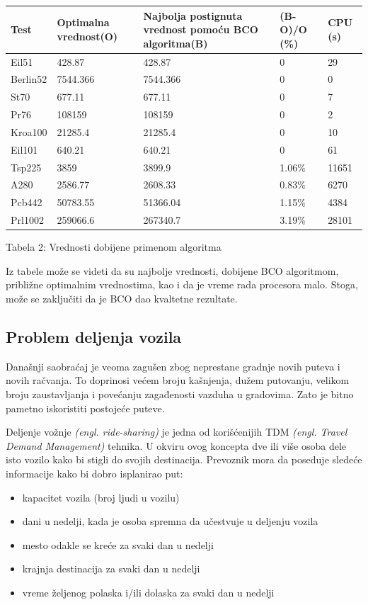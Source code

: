 \documentclass[a4paper]{article}
\begin{document}
{\begin{center}
\begin{tabular}{|p{1.2cm}|p{2cm}|p{2cm}|p{1.4cm}|p{1cm}|}
 \hline
Test & Optimalna vrednost(O) & Najbolja postignuta vrednost pomoću BCO algoritma(B)& (B-O)/O (\%) &CPU (s) \\ \hline
Eil51&428.87&428.87&0&29\\ \hline
Berlin52&7544.366&7544.366&0&0\\ \hline
St70&677.11&677.11&0&7\\ \hline
Pr76&108159&108159&0&2\\ \hline
Kroa100&21285.4&21285.4&0&10\\ \hline
Eil101&640.21&640.21&0&61\\ \hline
Tsp225&3859&3899.9&1.06\%&11651\\ \hline
A280&2586.77&2608.33&0.83\%&6270\\ \hline
Pcb442&50783.55&51366.04&1.15\%&4384\\ \hline
Prl1002&259066.6&267340.7&3.19\%&28101\\ \hline
\end{tabular}\par
\bigskip
Tabela 2: Vrednosti dobijene primenom algoritma
\end{center}
Iz tabele može se videti da su najbolje vrednosti, dobijene BCO algoritmom, približne optimalnim vrednostima, kao i da je vreme rada procesora malo. Stoga, može se zaključiti da je BCO dao kvaltetne rezultate.

\subsection{Problem deljenja vozila}
\label{subsec:drugaprimena}
Današnji saobraćaj je veoma zagušen zbog neprestane gradnje novih puteva i novih račvanja. To doprinosi većem broju kašnjenja, dužem putovanju, velikom broju zaustavljanja i povećanju zagađenosti vazduha u gradovima. Zato je bitno pametno iskoristiti postojeće puteve. 

Deljenje vožnje {\em(engl. ride-sharing)} je jedna od korišćenijih TDM {\em (engl. Travel Demand Management)} tehnika. U okviru ovog koncepta dve ili više osoba dele isto vozilo kako bi stigli do svojih destinacija. Prevoznik mora da poseduje sledeće informacije kako bi dobro isplanirao put:
\begin{itemize}%
\setlength{\labelsep}{10pt}
       \item kapacitet vozila (broj ljudi u vozilu)
       \item dani u nedelji, kada je osoba spremna da učestvuje u deljenju vozila
       \item mesto odakle se kreće za svaki dan u nedelji
       \item krajnja destinacija za svaki dan u nedelji
       \item vreme željenog polaska i/ili dolaska za svaki dan u nedelji 
\end{itemize}

}
\end{document}
